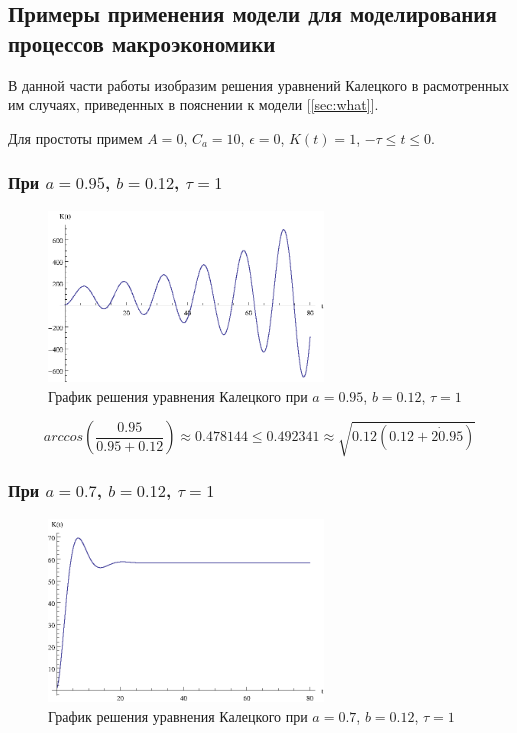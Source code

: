 \newpage

\subsection{Примеры применения модели для моделирования процессов макроэкономики}

В данной части работы изобразим решения уравнений Калецкого в расмотренных им случаях, приведенных в пояснении к модели [\ref{sec:what}].

Для простоты примем $A=0$, $C_a=10$, $\epsilon=0$, $K(t)=1$, $-\tau \leq t \leq 0$.

\subsubsection{При $a=0.95$, $b=0.12$, $\tau=1$}

\begin{figure}[h]
\begin{center}
\includegraphics[width=0.65\textwidth]{./4_economics/unstable.eps}
\end{center}
\caption{График решения уравнения Калецкого при $a=0.95$, $b=0.12$, $\tau=1$}
\end{figure}

\begin{equation}\label{eq:Kalecki-stab}
arccos \left( \frac{0.95}{0.95 + 0.12} \right) \approx 0.478144 \leq 0.492341 \approx \sqrt{0.12 (0.12 + 2 \dot 0.95)}
\end{equation}

\subsubsection{При $a=0.7$, $b=0.12$, $\tau=1$}

\begin{figure}[h]
\begin{center}
\includegraphics[width=0.65\textwidth]{./4_economics/stable.eps}
\end{center}
\caption{График решения уравнения Калецкого при $a=0.7$, $b=0.12$, $\tau=1$}
\end{figure}

